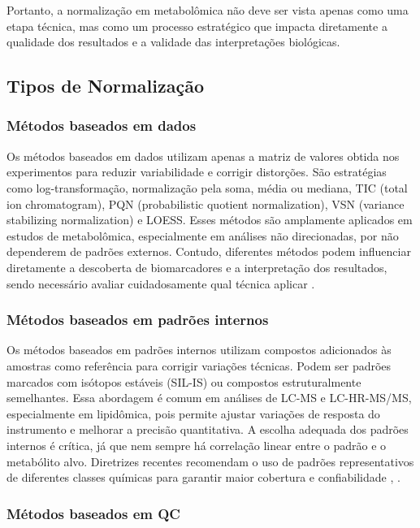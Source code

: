 Portanto, a normalização em metabolômica não deve ser vista apenas como uma etapa técnica, mas como um processo estratégico que impacta diretamente a qualidade dos resultados e a validade das interpretações biológicas.

\subsection{Tipos de Normalização}

\subsubsection{Métodos baseados em dados}

Os métodos baseados em dados utilizam apenas a matriz de valores obtida nos experimentos para reduzir variabilidade e corrigir distorções. São estratégias como log-transformação, normalização pela soma, média ou mediana, TIC (total ion chromatogram), PQN (probabilistic quotient normalization), VSN (variance stabilizing normalization) e LOESS. Esses métodos são amplamente aplicados em estudos de metabolômica, especialmente em análises não direcionadas, por não dependerem de padrões externos. Contudo, diferentes métodos podem influenciar diretamente a descoberta de biomarcadores e a interpretação dos resultados, sendo necessário avaliar cuidadosamente qual técnica aplicar \cite{datanor,li2016performance}.

\subsubsection{Métodos baseados em padrões internos}

Os métodos baseados em padrões internos utilizam compostos adicionados às amostras como referência para corrigir variações técnicas. Podem ser padrões marcados com isótopos estáveis (SIL-IS) ou compostos estruturalmente semelhantes. Essa abordagem é comum em análises de LC-MS e LC-HR-MS/MS, especialmente em lipidômica, pois permite ajustar variações de resposta do instrumento e melhorar a precisão quantitativa. A escolha adequada dos padrões internos é crítica, já que nem sempre há correlação linear entre o padrão e o metabólito alvo. Diretrizes recentes recomendam o uso de padrões representativos de diferentes classes químicas para garantir maior cobertura e confiabilidade \cite{drotleff2019guidelines}, \cite{datanor}.

\subsubsection{Métodos baseados em QC}

